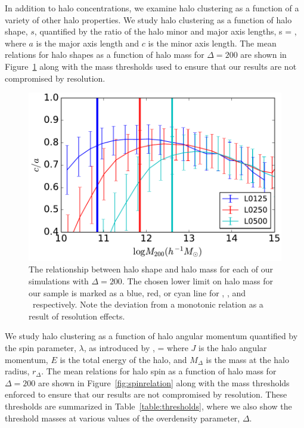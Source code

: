 \documentclass[usenatbib,usegraphicx,letterpaper]{mn2e}
\begin{document}
In addition to halo concentrations, we examine halo clustering as a function of a variety of other 
halo properties. We study halo clustering as a function of halo shape, $s$, 
quantified by the ratio of the halo minor and major axis lengths, 
%
\beq
s = ,
\eeq
%
where $a$ is the major axis length and $c$ is the minor axis length. 
The mean relations for halo shapes as a function of halo mass for $\Delta=200$ 
are shown in Figure~\ref{fig:srelation} along with the mass 
thresholds used to ensure that our results are not compromised by 
resolution.


\begin{figure}
\centering
\includegraphics[width=.5\textwidth]{masscut_shape_d200.pdf}
\caption{
The relationship between halo shape and 
halo mass for each of our simulations with $\Delta =200$. 
The chosen lower limit on halo mass for our sample is marked as 
a blue, red, or cyan line for \simA, \simB, and \simC \ respectively. 
Note the deviation from a monotonic relation as a result of resolution effects.
}
\label{fig:srelation}
\end{figure}

We study halo clustering as a function of halo angular momentum quantified 
by the spin parameter, $\lambda$, as introduced by \citep{peebles69},
\beq
\lambda = 
\eeq
where $J$ is the halo angular momentum, $E$ is the total energy of the 
halo, and $M_{\Delta}$ is the mass at the halo radius, $r_{\Delta}$. 
The mean relations for halo spin as a function of halo mass for $\Delta=200$ 
are shown in Figure~\ref{fig:spinrelation} along with the mass thresholds 
enforced to ensure that our results are not compromised by resolution. 
These thresholds are summarized in Table~\ref{table:thresholds}, where 
we also show the threshold masses at various values of the overdensity 
parameter, $\Delta$.
\end{document}
